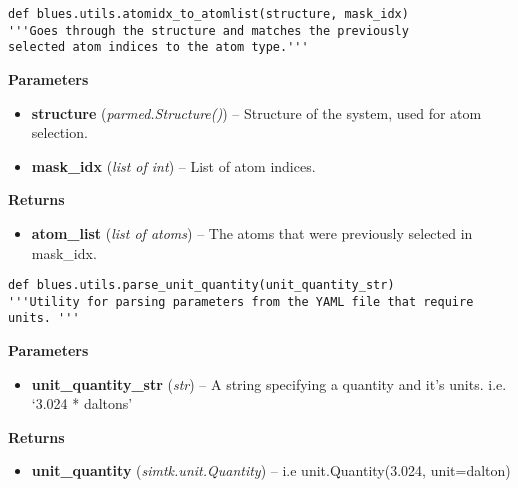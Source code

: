 \begin{description}
\begin{verbatim}
def blues.utils.atomidx_to_atomlist(structure, mask_idx)
'''Goes through the structure and matches the previously 
selected atom indices to the atom type.'''
\end{verbatim}


\begin{description}
\item
    \textbf{Parameters}
\begin{itemize}
\item
  \textbf{structure} (\emph{parmed.Structure()}) -- Structure of the
  system, used for atom selection.
\item
  \textbf{mask\_idx} (\emph{list of int}) -- List of atom indices.
\end{itemize}
\item
    \textbf{Returns}
\begin{itemize}
    \item
        \textbf{atom\_list} (\emph{list of atoms}) -- The atoms that were previously selected in mask\_idx.
\end{itemize}
\end{description}
\end{description}

\begin{description}
\begin{verbatim}
def blues.utils.parse_unit_quantity(unit_quantity_str)
'''Utility for parsing parameters from the YAML file that require units. '''
\end{verbatim}


\begin{description}
\item
    \textbf{Parameters}
\begin{itemize}
    \item
        \textbf{unit\_quantity\_str} (\emph{str}) -- A string specifying a quantity and it's units. i.e. `3.024 * daltons'
\end{itemize}
\item
    \textbf{Returns}
\begin{itemize}
    \item
        \textbf{unit\_quantity} (\emph{simtk.unit.Quantity}) -- i.e unit.Quantity(3.024, unit=dalton)
\end{itemize}
\end{description}
\end{description}

